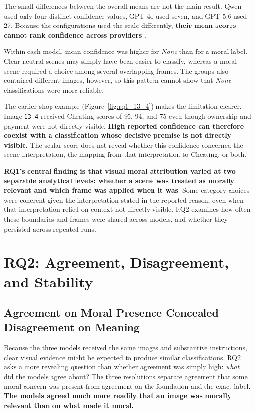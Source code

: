 The small differences between the overall means are not the main result. Qwen
used only four distinct confidence values, GPT-4o used seven, and GPT-5.6 used
27. Because the configurations used the scale differently, \textbf{their mean
scores cannot rank confidence across providers} \cite{xiong2024uncertainty}.

Within each model, mean confidence was higher for \textit{None} than for a
moral label. Clear neutral scenes may simply have been easier to classify,
whereas a moral scene required a choice among several overlapping frames. The
groups also contained different images, however, so this pattern cannot show
that \textit{None} classifications were more reliable.

The earlier shop example (Figure~\ref{fig:rq1_13_4}) makes the limitation
clearer. Image \texttt{13-4} received Cheating scores of 95, 94, and 75 even
though ownership and payment were not directly visible. \textbf{High reported
confidence can therefore coexist with a classification whose decisive premise
is not directly visible.} The scalar score does not reveal whether this
confidence concerned the scene interpretation, the mapping from that
interpretation to Cheating, or both.

\textbf{RQ1's central finding is that visual moral attribution varied at two
separable analytical levels: whether a scene was treated as morally relevant
and which frame was applied when it was.} Some category choices were coherent
given the interpretation stated in the reported reason, even when that
interpretation relied on context not directly visible. RQ2 examines how often
these boundaries and frames were shared across models, and whether they
persisted across repeated runs.


\FloatBarrier
\section{RQ2: Agreement, Disagreement, and Stability}
\label{sec:rq2_results}

\subsection{Agreement on Moral Presence Concealed Disagreement on Meaning}

Because the three models received the same images and substantive
instructions, clear visual evidence might be expected to produce similar
classifications. RQ2 asks a more revealing question than whether agreement was
simply high: \textit{what} did the models agree about? The three resolutions
separate agreement that some moral concern was present from agreement on the
foundation and the exact label. \textbf{The models agreed much more readily
that an image was morally relevant than on what made it moral.}

